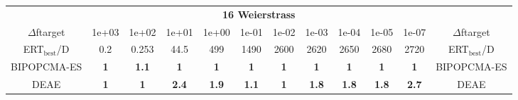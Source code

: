 \begin{tabular}{cccccccccccc}
 & \multicolumn{10}{c}{{\normalsize \textbf{16 Weierstrass}}}\\
$\Delta$ftarget& 1e+03& 1e+02& 1e+01& 1e+00& 1e-01& 1e-02& 1e-03& 1e-04& 1e-05& 1e-07 & $\Delta$ftarget \\
ERT$_{\textrm{best}}$/D& 0.2& 0.253& 44.5& 499& 1490& 2600& 2620& 2650& 2680& 2720 & ERT$_{\textrm{best}}$/D \\
\hline
BIPOPCMA-ES & \textbf{1} & \textbf{1.1} & \textbf{1} & \textbf{1} & \textbf{1} & \textbf{1} & \textbf{1} & \textbf{1} & \textbf{1} & \textbf{1} & BIPOPCMA-ES \cite{add_an_entry_for_BIPOPCMA-ES_in_bbob.bib}\\
DEAE & \textbf{1} & \textbf{1} & \textbf{2.4} & \textbf{1.9} & \textbf{1.1} & \textbf{1} & \textbf{1.8} & \textbf{1.8} & \textbf{1.8} & \textbf{2.7} & DEAE \cite{add_an_entry_for_DEAE_in_bbob.bib}
\end{tabular}

